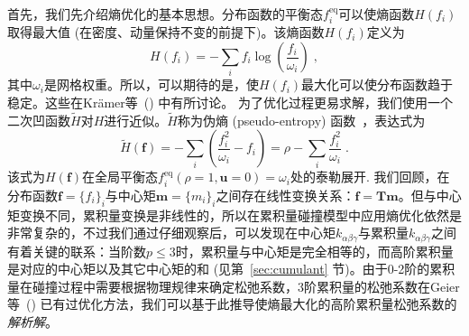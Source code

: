 首先，我们先介绍熵优化的基本思想。分布函数的平衡态$f^\text{eq}_i$可以使熵函数$H(f_i)$取得最大值 (在密度、动量保持不变的前提下)。该熵函数$H(f_i)$定义为
\begin{equation}
\label{eq:entropy_func}
H(f_i)=-\sum_i f_i \log \left(\frac{f_i}{\omega_i}\right) \;,
\end{equation}
其中$\omega_i$是网格权重。所以，可以期待的是，使$H(f_i)$最大化可以使分布函数趋于稳定。这些在Kr{\"a}mer等~(\citeyear{Kramer-2019}) 中有所讨论。
为了优化过程更易求解，我们使用一个二次凹函数$\tilde{H}$对$H$进行近似。$\tilde{H}$称为伪熵 (pseudo-entropy) 函数~\cite{Kramer-2019}，表达式为
\begin{equation}
\label{eq:pseudoentropy_func}
\tilde{H}(\bm{f})=-\sum_{i}\left(\frac{f_i^2}{\omega_i}-f_i\right)=\rho-\sum_{i} \frac{f_i^2}{\omega_i}\;.
\end{equation}
该式为$H(\bm{f})$在全局平衡态$f_i^{\mathrm{eq}}(\rho=1, \mathbf{u}=0)=\omega_i$处的泰勒展开.
我们回顾，在分布函数$\bm{f}\!=\!\{f_i\}_i$与中心矩$\bm{m}\!=\!\{m_i\}_i$之间存在线性变换关系：$\bm{f}\!=\!\bm{T}\bm{m}$。但与中心矩变换不同，累积量变换是非线性的，所以在累积量碰撞模型中应用熵优化依然是非常复杂的，不过我们通过仔细观察后，可以发现在中心矩$k_{\alpha\beta\gamma}$与累积量$k_{\alpha\beta\gamma}$之间有着关键的联系：当阶数$p\!\leq\!3$时，累积量与中心矩是完全相等的，而高阶累积量是对应的中心矩以及其它中心矩的和 (见第~\ref{sec:cumulant} 节)。由于0-2阶的累积量在碰撞过程中需要根据物理规律来确定松弛系数，3阶累积量的松弛系数在Geier等~(\citeyear{Geier-2017}) 已有过优化方法，我们可以基于此推导使熵最大化的高阶累积量松弛系数的\emph{解析解}。

